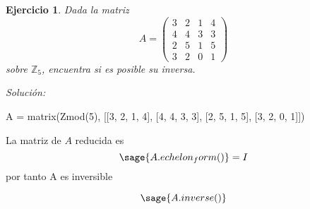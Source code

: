 \documentclass{amsart}
\newtheorem{ejer}{Ejercicio}
\def\z{\mathbb{Z}}
\begin{document}
\begin{ejer}
Dada la matriz 
\[ A =
	\left( \begin{array}{rrrr}
		3 & 2 & 1 & 4 \\
		4 & 4 & 3 & 3 \\
		2 & 5 & 1 & 5 \\
		3 & 2 & 0 & 1 
	\end{array}
	\right) 
	\]
sobre $\z _5$, encuentra si es posible su inversa.
\end{ejer}
{\it Soluci\'on:}

\begin{sageblock}
	A = matrix(Zmod(5), [[3, 2, 1, 4], [4, 4, 3, 3], [2, 5, 1, 5], [3, 2, 0, 1]])
\end{sageblock}

La matriz de $A$ reducida es
$$
	\sage{A.echelon_form()} = I
$$
por tanto A es inversible

$$
	\sage{A.inverse()}
$$

\end{document}
